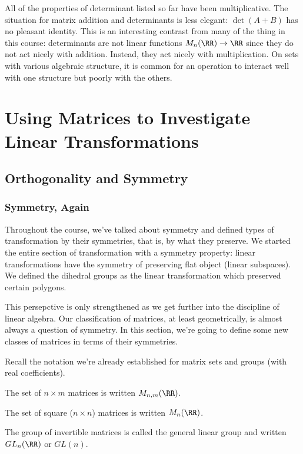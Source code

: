 \documentclass[fleqn]{report}
\begin{document}
All of the properties of determinant listed so far have been
multiplicative. The situation for matrix addition and
determinants is less elegant: $\det (A + B)$ has no pleasant
identity. This is an interesting contrast from many of the
thing in this course: determinants are not linear functions
$M_n(\RR) \rightarrow \RR$ since they do not act nicely with
addition. Instead, they act nicely with multiplication. On
sets with various algebraic structure, it is common for an
operation to interact well with one structure but poorly with
the others.

\chapter{Using Matrices to Investigate Linear Transformations}
\label{investigating-transformations}

\section{Orthogonality and Symmetry}
\label{orthogonality}

\subsection{Symmetry, Again}
\label{symmetry-again}

Throughout the course, we've talked about symmetry and defined
types of transformation by their symmetries, that is, by what they
preserve. We started the entire section of transformation with
a symmetry property: linear transformations have the symmetry of
preserving flat object (linear subspaces). We defined the
dihedral groups as the linear transformation which preserved certain
polygons.

This persepctive is only strengthened as we get further into
the discipline of linear algebra. Our classification of
matrices, at least geometrically, is almost always a question
of symmetry. In this section, we're going to define some new
classes of matrices in terms of their symmetries.

Recall the notation we're already established for matrix sets
and groups (with real coefficients).
\begin{smallitemize}
\item The set of $n \times m$ matrices is written
$M_{n,m}(\RR)$.
\item The set of square ($n \times n$) matrices is written
$M_n(\RR)$.
\item The group of invertible matrices is called the general
linear group and written $GL_n(\RR)$ or $GL(n)$.
\end{smallitemize}
\end{document}
